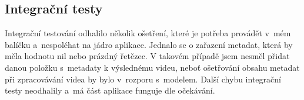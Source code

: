 \subsection{Integrační testy}
\par Integrační testování odhalilo několik ošetření, které je potřeba provádět v~mém balíčku a~nespoléhat na jádro aplikace. Jednalo se o zařazení metadat, která by měla hodnotu nil nebo prázdný řetězec. V takovém případě jsem nesměl přidat danou položku s~metadaty k výslednému videu, neboť ošetřování obsahu metadat při zpracovávání videa by bylo v~rozporu s~modelem. Další chybu integrační testy neodhalily a~má část aplikace funguje dle očekávání.